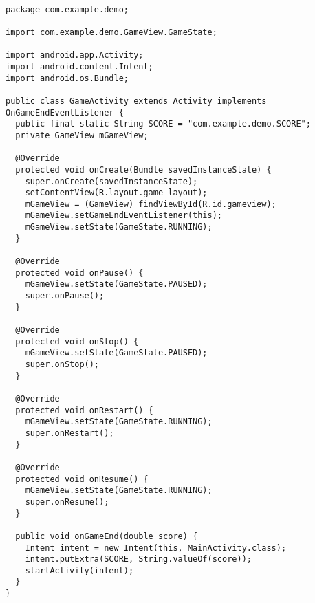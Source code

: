 
\begin{lstlisting}[caption=GameActivity.java]

package com.example.demo;

import com.example.demo.GameView.GameState;

import android.app.Activity;
import android.content.Intent;
import android.os.Bundle;

public class GameActivity extends Activity implements OnGameEndEventListener {
  public final static String SCORE = "com.example.demo.SCORE";
  private GameView mGameView;

  @Override
  protected void onCreate(Bundle savedInstanceState) {
    super.onCreate(savedInstanceState);
    setContentView(R.layout.game_layout);
    mGameView = (GameView) findViewById(R.id.gameview);
    mGameView.setGameEndEventListener(this);
    mGameView.setState(GameState.RUNNING);
  }

  @Override
  protected void onPause() {
    mGameView.setState(GameState.PAUSED);
    super.onPause();
  }
	
  @Override
  protected void onStop() {
    mGameView.setState(GameState.PAUSED);
    super.onStop();
  }
	
  @Override
  protected void onRestart() {
    mGameView.setState(GameState.RUNNING);
    super.onRestart();
  }
	
  @Override
  protected void onResume() {
    mGameView.setState(GameState.RUNNING);
    super.onResume();
  }
	
  public void onGameEnd(double score) {
    Intent intent = new Intent(this, MainActivity.class);
    intent.putExtra(SCORE, String.valueOf(score));
    startActivity(intent);	  
  }
}
\end{lstlisting}

